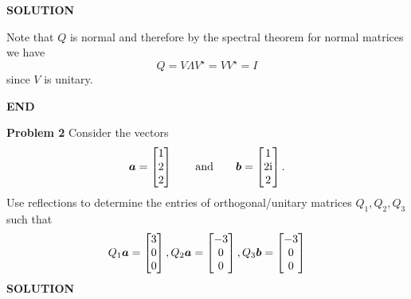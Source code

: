 \documentclass[12pt,a4paper]{article}
\def\a{ {\vc a} }
\def\b{ {\vc b} }
\begin{document}
\textbf{SOLUTION}

Note that $Q$ is normal and therefore by the spectral theorem for  normal matrices we have
\[
Q = V \ensuremath{\Lambda} V^\ensuremath{\star} = V V^\ensuremath{\star} = I
\]
since $V$ is unitary. 

\textbf{END}

\textbf{Problem 2} Consider the vectors
\[
\ensuremath{\bm{\a}} = \begin{bmatrix} 1 \\ 2 \\ 2 \end{bmatrix}\qquad\hbox{and}\qquad  \ensuremath{\bm{\b}} = \begin{bmatrix} 1 \\ 2{\rm i} \\ 2 \end{bmatrix}.
\]
Use reflections to determine the entries of orthogonal/unitary matrices $Q_1, Q_2, Q_3$ such that
\[
Q_1 \ensuremath{\bm{\a}} = \begin{bmatrix} 3 \\ 0 \\ 0 \end{bmatrix}, Q_2 \ensuremath{\bm{\a}} = \begin{bmatrix} -3 \\ 0 \\ 0 \end{bmatrix},
Q_3 \ensuremath{\bm{\b}} = \begin{bmatrix} -3 \\ 0 \\ 0 \end{bmatrix}
\]
\textbf{SOLUTION}
\end{document}
